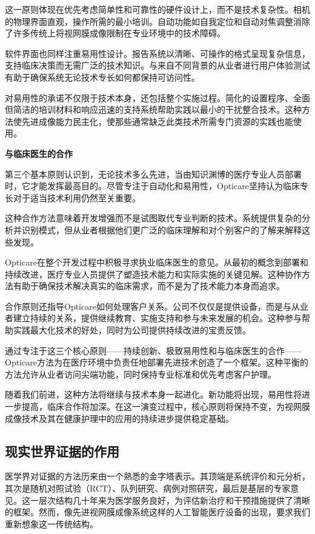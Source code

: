 \documentclass[
  Letterpaper,
]{scrbook}
\begin{document}
这一原则体现在优先考虑简单性和可靠性的硬件设计上，而不是技术复杂性。相机的物理界面直观，操作所需的最小培训。自动功能如自我定位和自动对焦调整消除了许多传统上将视网膜成像限制在专业环境中的技术障碍。

软件界面也同样注重易用性设计。报告系统以清晰、可操作的格式呈现复杂信息，支持临床决策而无需广泛的技术知识。与来自不同背景的从业者进行用户体验测试有助于确保系统无论技术专长如何都保持可访问性。

对易用性的承诺不仅限于技术本身，还包括整个实施过程。简化的设置程序、全面但简洁的培训材料和响应迅速的支持系统帮助实践以最小的干扰整合技术。这种方法使先进成像能力民主化，使那些通常缺乏此类技术所需专门资源的实践也能使用。

\textbf{与临床医生的合作}

第三个基本原则认识到，无论技术多么先进，当由知识渊博的医疗专业人员部署时，它才能发挥最高目的。尽管专注于自动化和易用性，Opticare坚持认为临床专长对于适当技术利用仍然至关重要。

这种合作方法意味着开发增强而不是试图取代专业判断的技术。系统提供复杂的分析并识别模式，但从业者根据他们更广泛的临床理解和对个别客户的了解来解释这些发现。

Opticare在整个开发过程中积极寻求执业临床医生的意见。从最初的概念到部署和持续改进，医疗专业人员提供了塑造技术能力和实际实施的关键见解。这种协作方法有助于确保技术解决真实的临床需求，而不是为了技术能力本身而追求。

合作原则还指导Opticare如何处理客户关系。公司不仅仅是提供设备，而是与从业者建立持续的关系，提供继续教育、实施支持和参与未来发展的机会。这种参与帮助实践最大化技术的好处，同时为公司提供持续改进的宝贵反馈。

通过专注于这三个核心原则------持续创新、极致易用性和与临床医生的合作------Opticare方法为在医疗环境中负责任地部署先进技术创造了一个框架。这种平衡的方法允许从业者访问尖端功能，同时保持专业标准和优先考虑客户护理。

随着我们前进，这种方法将继续与技术本身一起进化。新功能将出现，易用性将进一步提高，临床合作将加深。在这一演变过程中，核心原则将保持不变，为视网膜成像技术及其在健康护理中的应用的持续进步提供稳定基础。

\subsection*{现实世界证据的作用}\label{ux73b0ux5b9eux4e16ux754cux8bc1ux636eux7684ux4f5cux7528}

医学界对证据的方法历来由一个熟悉的金字塔表示。其顶端是系统评价和元分析，其次是随机对照试验（RCT）、队列研究、病例对照研究，最后是基层的专家意见。这一层次结构几十年来为医学服务良好，为评估新治疗和干预措施提供了清晰的框架。然而，像先进视网膜成像系统这样的人工智能医疗设备的出现，要求我们重新想象这一传统结构。
\end{document}
